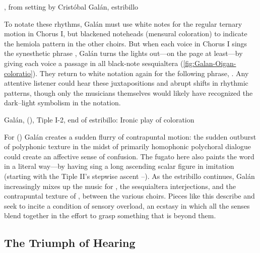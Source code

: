 {, from setting by Cristóbal Galán, estribillo}

To notate these rhythms, Galán must use white notes for the regular ternary
motion in Chorus I, but blackened noteheads (mensural coloration) to indicate
the hemiola pattern in the other choirs.
But when each voice in Chorus I sings the synesthetic phrase , Galán turns the lights out---on the page at least---by
giving each voice a passage in all black-note sesquialtera
(\cref{fig:Galan-Oigan-coloratio}).
They return to white notation again for the following phrase, .
Any attentive listener could hear these juxtapositions and abrupt shifts in
rhythmic patterns, though only the musicians themselves would likely have
recognized the dark--light symbolism in the notation.%
    \Autocite[36]{Kendrick:Jeremiah}

{Galán,  (), Tiple I-2,
end of estribillo: Ironic play of coloration}

For  () Galán creates a sudden
flurry of contrapuntal motion: the sudden outburst of polyphonic texture in the
midst of primarily homophonic polychoral dialogue could create an affective
sense of confusion.
The fugato here also paints the word  in a literal way---by
having  sing a long ascending scalar figure in imitation
(starting with the Tiple II's stepwise ascent --).
As the estribillo continues, Galán increasingly mixes up the music for
, the sesquialtera interjections, and the contrapuntal
texture of , between the various choirs.
Pieces like this describe and seek to incite a condition of sensory overload, an
ecstasy in which all the senses blend together in the effort to grasp something
that is beyond them.

\subsection{The Triumph of Hearing}

